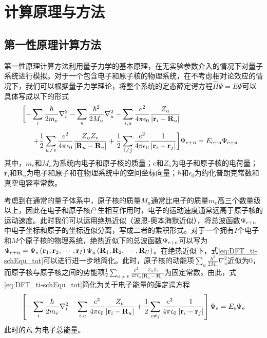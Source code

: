 \chapter{计算原理与方法}
\section{第一性原理计算方法}
第一性原理计算方法利用量子力学的基本原理，在无实验参数介入的情况下对量子系统进行模拟。对于一个包含电子和原子核的物理系统，在不考虑相对论效应的情况下，我们可以根据量子力学理论，将整个系统的定态薛定谔方程$\hat{H}\Psi =E\Psi$可以具体写成以下的形式\chinesecolon
\begin{equation}
    \label{eq:DFT_ti-schEqu_tot}
    \begin{split}
        \biggl[-\sum_{i} \frac{\hbar}{2m_e}\nabla_i^2-\sum_{u} \frac{\hbar^2}{2M_u}\nabla_u^2-\sum_{i,u}\frac{e^2}{4\pi\epsilon_0}\frac{Z_u}{\left\lvert {\mathbf r}_i - {\mathbf R}_u \right\rvert } \biggr. \\[+1ex]
        \biggl.+\frac{1}{2} \sum_{u\neq v}\frac{e^2}{4\pi\epsilon_0}\frac{Z_uZ_v}{\left\lvert {\mathbf R}_u-{\mathbf R}_v\right\rvert} + \frac{1}{2}\sum_{i\neq j}\frac{e^2}{4\pi\epsilon_0} \frac{1}{\left\lvert {\mathbf r}_i - {\mathbf r}_j \right\rvert} \biggr]&\Psi_{\rm e+n}=E_{\rm e+n}\Psi_{\rm e+n}
    \end{split}
\end{equation}
其中，$m_e$和$M_u$为系统内电子和原子核的质量；$e$和$Z_u$为电子和原子核的电荷量；${\bm r}_i$和${\bm R}_u$为电子和原子和在物理系统中的空间坐标向量；$\hbar$和$\epsilon_0$为约化普朗克常数和真空电容率常数。

考虑到在通常的量子体系中，原子核的质量$M_u$通常比电子的质量$m_e$高三个数量级以上，因此在电子和原子核产生相互作用时，电子的运动速度通常远高于原子核的运动速度。此时我们可以运用绝热近似（波恩-奥本海默近似），将总波函数$\Psi_{\rm e+n}$中电子坐标和原子的坐标近似分离，写成二者的乘积形式。对于一个拥有$I$个电子和$M$个原子核的物理系统，绝热近似下的总波函数$\Psi_{\rm e+n}$可以写为\chinesecolon $\Psi_{\rm e+n}=\Psi_{\rm e}\left({\mathbf r}_1,{\mathbf r}_2,\cdots,{\mathbf r}_I\right)\Psi_{\rm n}\left({\mathbf R}_1,{\mathbf R}_2,\cdots,{\mathbf R}_U\right)$。在绝热近似下，式\ref{eq:DFT_ti-schEqu_tot}可以进行进一步地简化。此时，原子核的动能项$\sum_{u} \frac{\hbar^2}{2M_u}\nabla_u^2$近似为0，而原子核与原子核之间的势能项$ \frac{1}{2} \sum_{u\neq v}\frac{e^2}{4\pi\epsilon_0}\frac{Z_uZ_v}{\left\lvert {\bm R}_u-{\bm R}_v\right\rvert}$为固定常数。由此，式\ref{eq:DFT_ti-schEqu_tot}简化为关于电子能量的薛定谔方程\chinesecolon
\begin{equation}
    \label{eq:DFT_schEqu_e}
    \left[-\sum_{i}\frac{\hbar}{2m_e}\nabla_i^2 -\sum_{i,u}\frac{e^2}{4\pi\epsilon_0}\frac{Z_{\rm u}}{\left\lvert{\mathbf r}_i - {\mathbf R}_u\right\rvert} + \frac{1}{2}\sum_{i\neq j}\frac{e^2}{4\pi\epsilon_0} \frac{1}{\left\lvert {\mathbf r}_i - {\mathbf r}_j \right\rvert} \right]\Psi_{\rm e}=E_{\rm e}\Psi_{\rm e}
\end{equation}
此时的$E_{\rm e}$为电子总能量。

